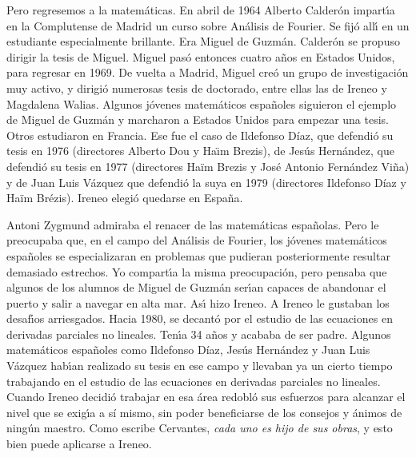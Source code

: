 Pero regresemos a la matem\'aticas. En abril de 1964 Alberto Calder\'on impart{\'\i}a en la Complutense de Madrid un curso sobre An\'alisis de Fourier. Se fij\'o all{\'\i} en un estudiante especialmente brillante. Era Miguel de Guzm\'an. Calder\'on se propuso dirigir la tesis de Miguel. Miguel pas\'o entonces cuatro a\~nos en Estados Unidos, para regresar  en 1969. De vuelta a Madrid, Miguel cre\'o un grupo de investigaci\'on muy activo, y dirigi\'o numerosas tesis de doctorado, entre ellas las de Ireneo y Magdalena Walias. Algunos j\'ovenes matem\'aticos espa\~noles siguieron el ejemplo de Miguel de Guzm\'an y marcharon a Estados Unidos para empezar una tesis. Otros estudiaron en Francia. Ese fue el caso de Ildefonso D\'iaz, que defendi\'o su tesis en 1976 (directores Alberto Dou y Ha{\"\i}m Brezis), de Jes\'us Hern\'andez, que defendi\'o su tesis en 1977 (directores Ha\"im Brezis y Jos\'e Antonio Fern\'andez Vi\~na) y de Juan Luis V\'azquez que defendi\'o la suya en 1979 (directores Ildefonso D\'iaz y Ha\"im Br\'ezis). Ireneo elegi\'o quedarse en Espa\~na.



Antoni Zygmund admiraba el renacer de las matem\'aticas espa\~nolas. Pero le preocupaba que, en el campo del An\'alisis de Fourier, los j\'ovenes matem\'aticos espa\~noles se especializaran en problemas que pudieran posteriormente resultar demasiado estrechos. Yo compart{\'\i}a la misma preocupaci\'on, pero pensaba que algunos de los alumnos de Miguel de Guzm\'an ser{\'\i}an capaces de abandonar  el  puerto y  salir a navegar
en alta mar. As{\'\i} hizo Ireneo. A Ireneo le gustaban los desaf{\'\i}os arriesgados. Hacia 1980, se decant\'o por el estudio de las ecuaciones en derivadas parciales no lineales. Ten{\'\i}a 34 a\~nos y acababa de ser padre. Algunos matem\'aticos espa\~noles como  Ildefonso D\'iaz, Jes\'us Hern\'andez y Juan Luis V\'azquez hab{\'\i}an realizado su tesis en ese campo y  llevaban ya un cierto tiempo trabajando en el estudio de las ecuaciones en derivadas parciales no lineales. Cuando Ireneo decidi\'o trabajar en esa \'area   redobl\'o sus esfuerzos para alcanzar el nivel que se exig{\'\i}a a s{\'i} mismo, sin poder  beneficiarse de los consejos y \'animos de ning\'un maestro. Como escribe Cervantes, {\it cada uno es hijo de sus obras}, y esto bien puede aplicarse a Ireneo.



